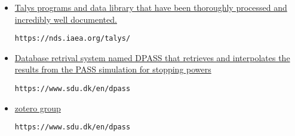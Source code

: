 \documentclass[12pt]{article}
\begin{document}
\begin{itemize}
\item \href{https://nds.iaea.org/talys/
}{Talys programs and data library that have been thoroughly processed and incredibly well documented.}
\begin{lstlisting}[breaklines]
https://nds.iaea.org/talys/
\end{lstlisting}


\item \href{https://www.sdu.dk/en/dpass
}{Database retrival system named DPASS that retrieves and interpolates the results from the PASS simulation for stopping powers}
\begin{lstlisting}[breaklines]
https://www.sdu.dk/en/dpass
\end{lstlisting}

\item \href{https://www.sdu.dk/en/dpass
}{zotero group}
\begin{lstlisting}[breaklines]
https://www.sdu.dk/en/dpass
\end{lstlisting}

\end{itemize}
\end{document}
